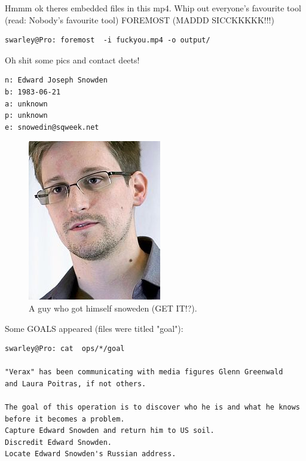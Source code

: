 \documentclass[11pt]{report}
\begin{document}
Hmmm ok theres embedded files in this mp4. Whip out everyone's favourite tool (read: Nobody's favourite tool) FOREMOST (MADDD SICCKKKKK!!!)

\begin{lstlisting}
swarley@Pro: foremost  -i fuckyou.mp4 -o output/
\end{lstlisting}

Oh shit some pics and contact deets!

\begin{lstlisting}
n: Edward Joseph Snowden
b: 1983-06-21
a: unknown
p: unknown
e: snowedin@sqweek.net
\end{lstlisting}
\begin{figure}[h!c]
  \includegraphics[totalheight=15cm]{output/verax/photo.jpg}
  \caption{A guy who got himself snoweden (GET IT!?).} %
\end{figure}
Some GOALS appeared (files were titled "goal"):

\begin{lstlisting}
swarley@Pro: cat  ops/*/goal

"Verax" has been communicating with media figures Glenn Greenwald
and Laura Poitras, if not others.

The goal of this operation is to discover who he is and what he knows
before it becomes a problem.
Capture Edward Snowden and return him to US soil.
Discredit Edward Snowden.
Locate Edward Snowden's Russian address.
\end{lstlisting}
\end{document}
